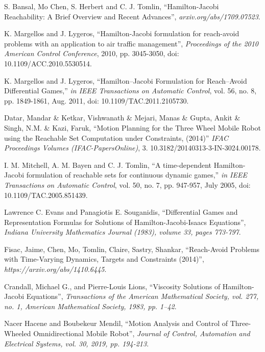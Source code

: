 \begin{thebibliography}{1}


S. Bansal, Mo Chen, S. Herbert and C. J. Tomlin, ``Hamilton-Jacobi Reachability: A Brief Overview and Recent Advances'',
\emph{arxiv.org/abs/1709.07523}.

K. Margellos and J. Lygeros, ``Hamilton-Jacobi formulation for reach-avoid problems with an application to air traffic management'',
\emph{Proceedings of the 2010 American Control Conference}, 2010, pp. 3045-3050, doi: 10.1109/ACC.2010.5530514.

K. Margellos and J. Lygeros, ``Hamilton–Jacobi Formulation for Reach–Avoid Differential Games,''
\emph{in IEEE Transactions on Automatic Control}, vol. 56, no. 8, pp. 1849-1861, Aug. 2011, doi: 10.1109/TAC.2011.2105730.

Datar, Mandar \& Ketkar, Vishwanath \& Mejari, Manas \& Gupta, Ankit \& Singh, N.M. \& Kazi, Faruk, ``Motion Planning for the Three Wheel Mobile Robot using the Reachable Set Computation under Constraints, (2014)''
\emph{IFAC Proceedings Volumes (IFAC-PapersOnline)}, 3. 10.3182/20140313-3-IN-3024.00178.

I. M. Mitchell, A. M. Bayen and C. J. Tomlin, ``A time-dependent Hamilton-Jacobi formulation of reachable sets for continuous dynamic games,''
\emph{in IEEE Transactions on Automatic Control}, vol. 50, no. 7, pp. 947-957, July 2005, doi: 10.1109/TAC.2005.851439.

Lawrence C. Evans and Panagiotis E. Souganidis, ``Differential Games and Representation Formulas for Solutions of Hamilton-Jacobi-Isaacs Equations'',
\emph{Indiana University Mathematics Journal (1983), volume 33, pages 773-797}.

Fisac, Jaime, Chen, Mo, Tomlin, Claire, Sastry, Shankar, ``Reach-Avoid Problems with Time-Varying Dynamics, Targets and Constraints (2014)'',
\emph{https://arxiv.org/abs/1410.6445}.

Crandall, Michael G., and Pierre-Louis Lions, ``Viscosity Solutions of Hamilton-Jacobi Equations'',
\emph{Transactions of the American Mathematical Society, vol. 277, no. 1, American Mathematical Society, 1983, pp. 1–42}.

Nacer Hacene and Boubekeur Mendil, ``Motion Analysis and Control of Three-Wheeled Omnidirectional Mobile Robot'',
\emph{Journal of Control, Automation and Electrical Systems, vol. 30, 2019, pp. 194-213}.


\end{thebibliography}
